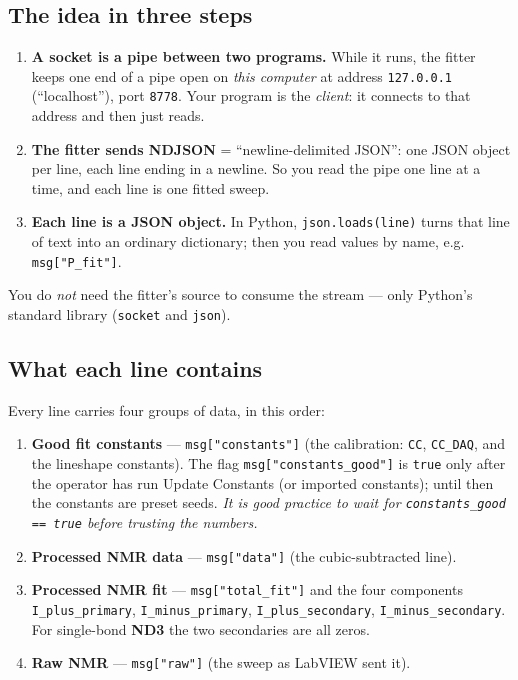 \documentclass[11pt]{article}
\newcommand{\code}[1]{\lstinline[style=plain]|#1|}
\begin{document}
\subsection{The idea in three steps}

\begin{enumerate}[nosep]
  \item \textbf{A socket is a pipe between two programs.} While it runs, the fitter keeps one
        end of a pipe open on \emph{this computer} at address \code{127.0.0.1} (``localhost''),
        port \code{8778}. Your program is the \emph{client}: it connects to that address and
        then just reads.
  \item \textbf{The fitter sends NDJSON} = ``newline-delimited JSON'': one JSON object per line,
        each line ending in a newline. So you read the pipe one line at a time, and each line is
        one fitted sweep.
  \item \textbf{Each line is a JSON object.} In Python, \code{json.loads(line)} turns that line
        of text into an ordinary dictionary; then you read values by name, e.g.
        \code{msg["P_fit"]}.
\end{enumerate}

You do \emph{not} need the fitter's source to consume the stream --- only Python's standard
library (\code{socket} and \code{json}).

\subsection{What each line contains}

Every line carries four groups of data, in this order:

\begin{enumerate}[nosep]
  \item \textbf{Good fit constants} --- \code{msg["constants"]} (the calibration: \code{CC},
        \code{CC_DAQ}, and the lineshape constants). The flag \code{msg["constants_good"]} is
        \code{true} only after the operator has run Update Constants (or imported constants);
        until then the constants are preset seeds. \emph{It is good practice to wait for
        \code{constants_good == true} before trusting the numbers.}
  \item \textbf{Processed NMR data} --- \code{msg["data"]} (the cubic-subtracted line).
  \item \textbf{Processed NMR fit} --- \code{msg["total_fit"]} and the four components
        \code{I_plus_primary}, \code{I_minus_primary}, \code{I_plus_secondary},
        \code{I_minus_secondary}. For single-bond \textbf{ND3} the two secondaries are all zeros.
  \item \textbf{Raw NMR} --- \code{msg["raw"]} (the sweep as LabVIEW sent it).
\end{enumerate}
\end{document}
